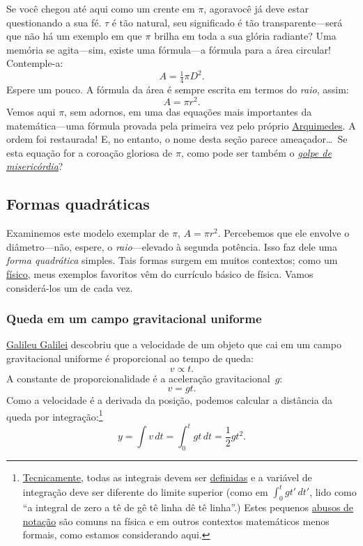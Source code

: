 Se você chegou até aqui como um crente em $\pi$,  agoravocê já deve estar questionando a sua fé. $\tau$ é tão natural, seu significado é tão transparente---será que não há um exemplo em que $\pi$ brilha em toda a sua glória radiante? Uma memória se agita---sim, existe uma fórmula---a fórmula para a área circular! Contemple-a:
\[ A = \tfrac{1}{4} \pi D^2. \]
Espere um pouco. A fórmula da área é sempre escrita em termos do \emph{raio}, assim:
\[ A = \pi r^2. \]
Vemos aqui $\pi$, sem adornos, em uma das equações mais importantes da matemática---uma fórmula provada pela primeira vez pelo próprio \href{https://pt.wikipedia.org/wiki/Arquimedes}{Arquimedes}. A ordem foi restaurada! E, no entanto, o nome desta seção parece ameaçador\ldots\ Se esta equação for a coroação gloriosa de $\pi$, como pode ser também o \href{https://pt.wikipedia.org/wiki/Golpe_de_miseric%C3%B3rdia}{\emph{golpe de misericórdia}}?

  \subsection{Formas quadráticas} %
  \label{sec:quadratic_forms}

Examinemos este modelo exemplar de $\pi$, $A = \pi r^2$. Percebemos que ele envolve o diâmetro---não, espere, o \emph{raio}---elevado à segunda potência. Isso faz dele uma \emph{forma quadrática} simples. Tais formas surgem em muitos contextos; como um \href{https://thesis.library.caltech.edu/1940/}{físico}, meus exemplos favoritos vêm do currículo básico de física. Vamos considerá-los um de cada vez.

    \subsubsection{Queda em um campo gravitacional uniforme} %
    \label{sec:falling_in_a_uniform_gravitational_field}

\href{https://pt.wikipedia.org/wiki/Galileu_Galilei}{Galileu Galilei} descobriu que a velocidade de um objeto que cai em um campo gravitacional uniforme é proporcional ao tempo de queda:
\[ v \propto t. \]
A constante de proporcionalidade é a aceleração gravitacional~$g$:
\[ v = g t. \]
Como a velocidade é a derivada da posição, podemos calcular a distância da queda por integração:\footnote{\href{https://xkcd.com/1475/}{Tecnicamente}, todas as integrais devem ser \href{https://mathworld.wolfram.com/DefiniteIntegral.html}{definidas} e a variável de integração deve ser diferente do limite superior (como em $\int_0^t gt'\,dt'$, lido como ``a integral de zero a tê de gê tê linha dê tê linha''.) Estes pequenos \href{https://en.wikipedia.org/wiki/Abuse_of_notation}{abusos de notação} são comuns na física e em outros contextos matemáticos menos formais, como estamos considerando aqui.}
\[ y = \int v\,dt = \int_0^t gt\,dt = \textstyle{\frac{1}{2}} gt^2. \]


